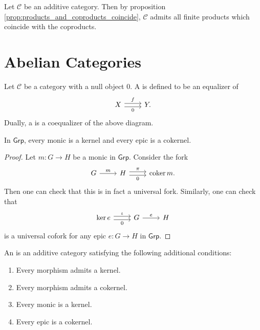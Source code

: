 \begin{remark}
	Let $\mathcal{C}$ be an additive category. Then by proposition \ref{prop:products_and_coproducts_coincide}, $\mathcal{C}$ admits all finite products which coincide with the coproducts.
\end{remark}

\section{Abelian Categories}

\begin{definition}
	Let $\mathcal{C}$ be a category with a null object $0$. A  is defined to be an equalizer of
	\begin{equation*}
		\begin{tikzcd}
			X \arrow[r, shift left, "f"]\arrow[r,shift right,"0"'] & Y.
		\end{tikzcd}
	\end{equation*}
	Dually, a  is a coequalizer of the above diagram. 
\end{definition}

\begin{lemma}
	In $\mathsf{Grp}$, every monic is a kernel and every epic is a cokernel.
\end{lemma}

\begin{proof}
	Let $m : G \to H$ be a monic in $\mathsf{Grp}$. Consider the fork
	\begin{equation*}
		\begin{tikzcd}
			G \arrow[r,"m"] & H \arrow[r,shift left,"\pi"]\arrow[r,shift right,"0"'] & \coker m.
		\end{tikzcd}
	\end{equation*}
	\noindent Then one can check that this is in fact a universal fork. Similarly, one can check that
	\begin{equation*}
		\begin{tikzcd}
			\ker e \arrow[r,shift left,"\iota"]\arrow[r,shift right,"0"'] & G \arrow[r,"e"] & H
		\end{tikzcd}
	\end{equation*}
	\noindent is a universal cofork for any epic $e : G \to H$ in $\mathsf{Grp}$.
\end{proof}

\begin{definition}
	An  is an additive category satisfying the following additional conditions:
	\begin{enumerate}[label = \textup{(}\alph*\textup{)}, wide = 0pt]
		\item Every morphism admits a kernel.
		\item Every morphism admits a cokernel.
		\item Every monic is a kernel.
		\item Every epic is a cokernel.
	\end{enumerate}
\end{definition}

